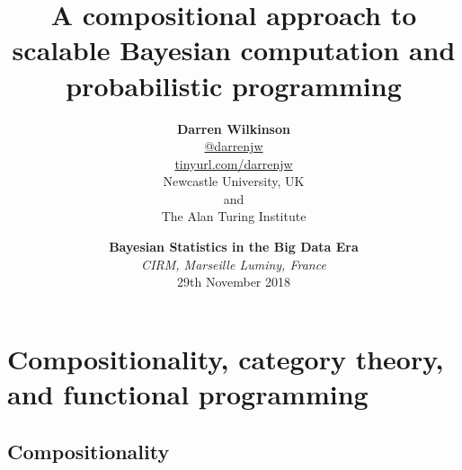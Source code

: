 \documentclass[mathserif,handout]{beamer}
\begin{document}
\title{A compositional approach to scalable Bayesian computation and probabilistic programming}
\author[Darren Wilkinson --- Newcastle 26/10/18]{\textbf{\large Darren Wilkinson} \\
  \url{@darrenjw}\\
  \alert{\url{tinyurl.com/darrenjw}}\\
Newcastle University, UK\\and\\The Alan Turing Institute}
\date{\textbf{Bayesian Statistics in the Big Data Era}\\\emph{CIRM, Marseille Luminy, France}\\29th November 2018}


\frame{\titlepage}


\section{Compositionality, category theory, and functional programming}

\subsection{Compositionality}
\end{document}

